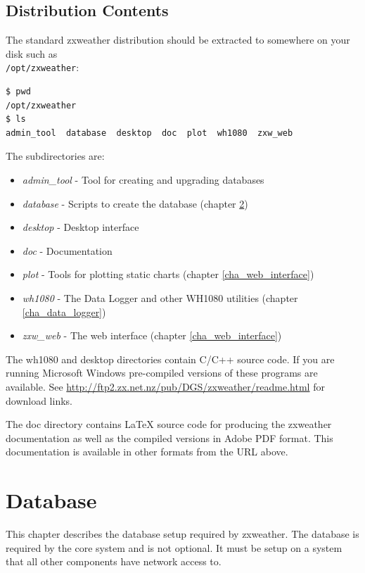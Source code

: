 \documentclass[a4paper,10pt,draft]{book}
\begin{document}
\section{Distribution Contents}
The standard zxweather distribution should be extracted to somewhere on your disk such as \\ \verb|/opt/zxweather|:

\begin{verbatim}
$ pwd
/opt/zxweather
$ ls
admin_tool  database  desktop  doc  plot  wh1080  zxw_web
\end{verbatim}

The subdirectories are:

\begin{itemize}
\item \emph{admin\_tool} - Tool for creating and upgrading databases
\item \emph{database} - Scripts to create the database (chapter \ref{cha_database})
\item \emph{desktop}  - Desktop interface
\item \emph{doc} - Documentation
\item \emph{plot} - Tools for plotting static charts (chapter \ref{cha_web_interface})
\item \emph{wh1080} - The Data Logger and other WH1080 utilities (chapter \ref{cha_data_logger})
\item \emph{zxw\_web} - The web interface (chapter \ref{cha_web_interface})
\end{itemize}

The wh1080 and desktop directories contain C/C++ source code. If you are running Microsoft Windows pre-compiled versions of these programs are available. See \url{http://ftp2.zx.net.nz/pub/DGS/zxweather/readme.html} for download links.

The doc directory contains \LaTeX{} source code for producing the zxweather documentation as well as the compiled versions in Adobe PDF format. This documentation is available in other formats from the URL above.

\chapter{Database}
\label{cha_database}

This chapter describes the database setup required by zxweather. The database is required by the core system and is not optional. It must be setup on a system that all other components have network access to.
\end{document}
